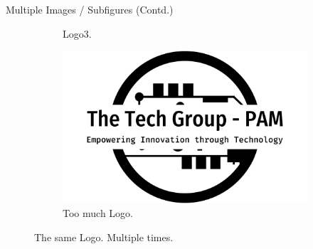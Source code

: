 \documentclass{beamer}
\begin{document}
\begin{frame}{Multiple Images / Subfigures (Contd.)}
\begin{figure}[h!]
\begin{subfigure}[b]{0.2\linewidth}
      \caption{Logo3.}
    \end{subfigure}
    \begin{subfigure}[b]{0.5\linewidth}
      \includegraphics[width=\linewidth]{../images/the-tech-group-pam-high-resolution-logo-black-on-transparent-background_01.png}
      \caption{Too much Logo.}
    \end{subfigure}
    \caption{The same Logo. Multiple times.}
    \label{fig:logo3}
  \end{figure}
\end{frame}
\end{document}
